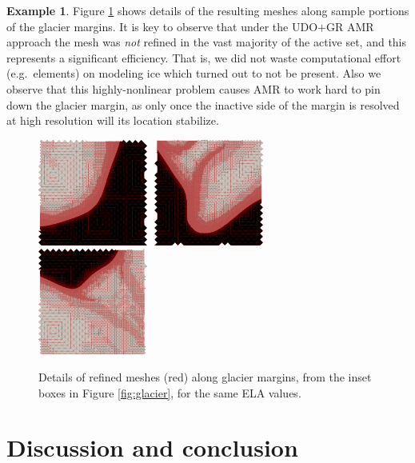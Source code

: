\documentclass[]{interact}
\theoremstyle{plain}%
\theoremstyle{definition}
\newtheorem{example}[theorem]{Example}
\theoremstyle{remark}
\begin{document}
\begin{example}
Figure \ref{fig:insetmeshes} shows details of the resulting meshes along sample portions of the glacier margins.  It is key to observe that under the UDO$+$GR AMR approach the mesh was \emph{not} refined in the vast majority of the active set, and this represents a significant efficiency.  That is, we did not waste computational effort (e.g.~elements) on modeling ice which turned out to not be present.  Also we observe that this highly-nonlinear problem causes AMR to work hard to pin down the glacier margin, as only once the inactive side of the margin is resolved at high resolution will its location stabilize.
\begin{figure}[ht]
\centering
\mbox{\includegraphics[width=0.32\textwidth]{static/glacier/sub1000.png} \,\includegraphics[width=0.32\textwidth]{static/glacier/sub800.png} \,\includegraphics[width=0.32\textwidth]{static/glacier/sub600.png}}
\caption{Details of refined meshes (red) along glacier margins, from the inset boxes in Figure \ref{fig:glacier}, for the same ELA values.}
\label{fig:insetmeshes}
\end{figure}
\end{example}


\section{Discussion and conclusion} \label{sec:conclusion}
\end{document}
